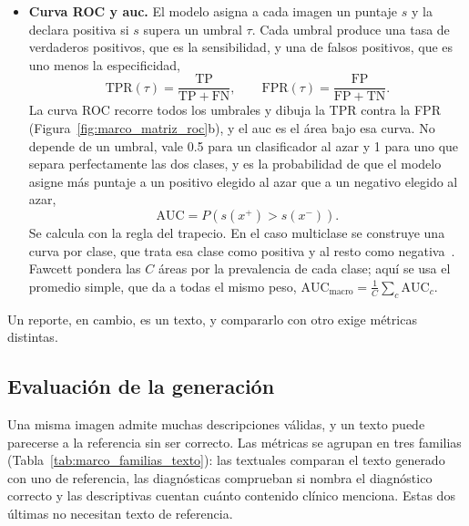 \begin{itemize}
    \item \textbf{Curva ROC y \gls{auc}.} El modelo asigna a cada imagen un puntaje $s$ y la declara positiva si
    $s$ supera un umbral $\tau$. Cada umbral produce una tasa de verdaderos positivos, que es la sensibilidad, y
    una de falsos positivos, que es uno menos la especificidad,
    \begin{equation}
        \mathrm{TPR}(\tau) = \frac{\mathrm{TP}}{\mathrm{TP} + \mathrm{FN}}, \qquad
        \mathrm{FPR}(\tau) = \frac{\mathrm{FP}}{\mathrm{FP} + \mathrm{TN}}.
        \label{eq:marco_tpr_fpr}
    \end{equation}
    La curva ROC recorre todos los umbrales y dibuja la TPR contra la FPR (Figura~\ref{fig:marco_matriz_roc}b),
    y el \gls{auc} es el área bajo esa curva. No depende de un umbral, vale 0.5 para un clasificador al azar y 1
    para uno que separa perfectamente las dos clases, y es la probabilidad de que el modelo asigne más puntaje a
    un positivo elegido al azar que a un negativo elegido al azar,
    \begin{equation}
        \mathrm{AUC} = P\!\left(s(x^{+}) > s(x^{-})\right).
        \label{eq:marco_auc}
    \end{equation}
    Se calcula con la regla del trapecio. En el caso multiclase se construye una curva por clase, que trata esa
    clase como positiva y al resto como negativa~\cite{fawcett2006introduction}. Fawcett pondera las $C$ áreas por
    la prevalencia de cada clase; aquí se usa el promedio simple, que da a todas el mismo peso,
    $\mathrm{AUC}_{\text{macro}} = \frac{1}{C}\sum_{c} \mathrm{AUC}_c$.
\end{itemize}

Un reporte, en cambio, es un texto, y compararlo con otro exige métricas distintas.

\subsection{Evaluación de la generación}
\label{sec:marco_eval_texto}

Una misma imagen admite muchas descripciones válidas, y un texto puede parecerse a la referencia sin ser
correcto. Las métricas se agrupan en tres familias (Tabla~\ref{tab:marco_familias_texto}): las textuales
comparan el texto generado con uno de referencia, las diagnósticas comprueban si nombra el diagnóstico
correcto y las descriptivas cuentan cuánto contenido clínico menciona. Estas dos últimas no necesitan texto
de referencia.

